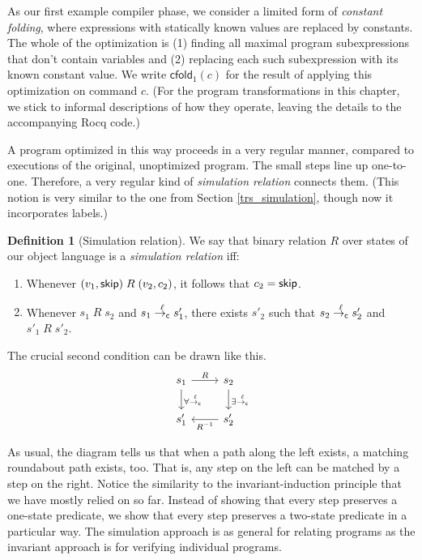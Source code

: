 \documentclass{amsbook}
\theoremstyle{definition}
\newtheorem{definition}[theorem]{Definition}
\theoremstyle{remark}
\numberwithin{section}{chapter}
\numberwithin{equation}{chapter}
\begin{document}
\newcommand{\cfold}[1]{\mathsf{cfold}_1(#1)}

As our first example compiler phase, we consider a limited form of \emph{constant folding}, where expressions with statically known values are replaced by constants.
The whole of the optimization is (1) finding all maximal program subexpressions that don't contain variables and (2) replacing each such subexpression with its known constant value.
We write $\cfold{c}$ for the result of applying this optimization on command $c$.
(For the program transformations in this chapter, we stick to informal descriptions of how they operate, leaving the details to the accompanying Rocq code.)

A program optimized in this way proceeds in a very regular manner, compared to executions of the original, unoptimized program.
The small steps line up one-to-one.
Therefore, a very regular kind of \emph{simulation relation} connects them.
(This notion is very similar to the one from Section \ref{trs_simulation}, though now it incorporates labels.)

\begin{definition}[Simulation relation]
  We say that binary relation $R$ over states of our object language is a \emph{simulation relation} iff:
  \begin{enumerate}
    \item Whenever $(v_1, \mathsf{skip}) \; R \; (v_2, c_2)$, it follows that $c_2 = \mathsf{skip}$.
    \item Whenever $s_1 \; R \; s_2$ and $s_1 \stackrel{\ell}{\to_\mathsf{c}} s'_1$, there exists $s'_2$ such that $s_2 \stackrel{\ell}{\to_\mathsf{c}} s'_2$ and $s'_1 \; R \; s'_2$. 
  \end{enumerate}
\end{definition}

The crucial second condition can be drawn like this.
\[
\begin{tikzcd}
s_1 \arrow{r}{R} \arrow{d}{\forall \stackrel{\ell}{\to_{\mathsf{c}}}} & s_2 \arrow{d}{\exists \stackrel{\ell}{\to_{\mathsf{c}}}} \\
s'_1 & s'_2 \arrow{l}{R^{-1}}
\end{tikzcd}
\]

\invariants
As usual, the diagram tells us that when a path along the left exists, a matching roundabout path exists, too.
That is, any step on the left can be matched by a step on the right.
Notice the similarity to the invariant-induction principle that we have mostly relied on so far.
Instead of showing that every step preserves a one-state predicate, we show that every step preserves a two-state predicate in a particular way.
The simulation approach is as general for relating programs as the invariant approach is for verifying individual programs.
\end{document}
